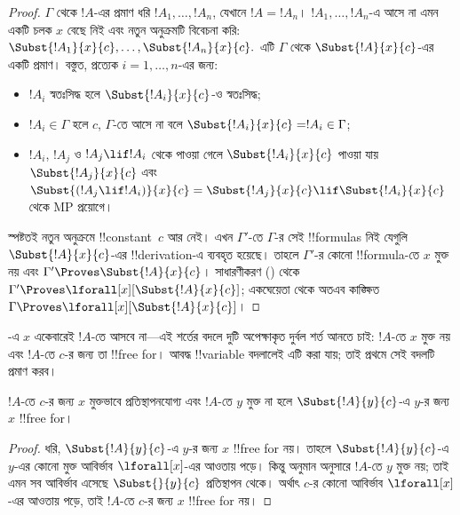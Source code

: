 \documentclass[../../../include/open-logic-section]{subfiles}
\begin{document}
\begin{proof} $\Gamma$ থেকে $!A$-এর প্রমাণ ধরি $!A_1,\ldots,!A_n$,
যেখানে $!A=!A_n$। $!A_1,\ldots,!A_n$-এ আসে না এমন একটি চলক $x$ বেছে নিই
এবং নতুন অনুক্রমটি বিবেচনা করি:
$\Subst{!A_1}{x}{c},\ldots,\Subst{!A_n}{x}{c}.$
এটি $\Gamma$ থেকে $\Subst{!A}{x}{c}$-এর একটি প্রমাণ। বস্তুত,
প্রত্যেক $i=1,\ldots,n$-এর জন্য:
\begin{itemize} \item $!A_i$ স্বতঃসিদ্ধ হলে $\Subst{!A_i}{x}{c}$-ও
স্বতঃসিদ্ধ; \item $!A_i \in \Gamma$ হলে $c$, $\Gamma$-তে আসে না বলে
$\Subst{!A_i}{x}{c} = !A_i \in \Gamma$; \item $!A_i$, $!A_j$
ও $!A_j \lif !A_i$ থেকে পাওয়া গেলে $\Subst{!A_i}{x}{c}$
পাওয়া যায় $\Subst{!A_j}{x}{c}$ এবং $\Subst{(!A_j \lif !A_i)}{x}{c}
= \Subst{!A_j}{x}{c} \lif \Subst{!A_i}{x}{c}$ থেকে MP প্রয়োগে।
\end{itemize} স্পষ্টতই নতুন অনুক্রমে !!{constant}~$c$ আর নেই। এখন
$\Gamma'$-তে $\Gamma$-র সেই !!{formula}s নিই যেগুলি
$\Subst{!A}{x}{c}$-এর !!{derivation}-এ ব্যবহৃত হয়েছে। তাহলে
$\Gamma'$-র কোনো !!{formula}-তে $x$ মুক্ত নয় এবং
$\Gamma' \Proves \Subst{!A}{x}{c}$। সাধারণীকরণ
() থেকে $\Gamma'
\Proves \lforall[x][\Subst{!A}{x}{c}]$; একঘেয়েতা থেকে অতএব কাঙ্ক্ষিত
$\Gamma \Proves \lforall[x][\Subst{!A}{x}{c}]$।
\end{proof}

\begin{explain}
-এ $x$ একেবারেই $!A$-তে আসবে না—এই শর্তের বদলে
দুটি অপেক্ষাকৃত দুর্বল শর্ত আনতে চাই: $!A$-তে $x$ মুক্ত নয় এবং
$!A$-তে $c$-র জন্য তা !!{free for}। আবদ্ধ !!{variable} বদলালেই
এটি করা যায়; তাই প্রথমে সেই বদলটি প্রমাণ করব।
\end{explain}

\begin{lem}
$!A$-তে $c$-র জন্য $x$ মুক্তভাবে প্রতিস্থাপনযোগ্য এবং $!A$-তে $y$ মুক্ত
না হলে $\Subst{!A}{y}{c}$-এ $y$-র জন্য $x$ !!{free for}।
\end{lem}

\begin{proof} ধরি, $\Subst{!A}{y}{c}$-এ $y$-র জন্য $x$
!!{free for} নয়। তাহলে $\Subst{!A}{y}{c}$-এ $y$-এর কোনো মুক্ত
আবির্ভাব $\lforall[x]$-এর আওতায় পড়ে। কিন্তু অনুমান অনুসারে $!A$-তে
$y$ মুক্ত নয়; তাই এমন সব আবির্ভাব এসেছে $\Subst{}{y}{c}$ প্রতিস্থাপন
থেকে। অর্থাৎ $c$-র কোনো আবির্ভাব $\lforall[x]$-এর আওতায় পড়ে,
তাই $!A$-তে $c$-র জন্য $x$ !!{free for} নয়।
\end{proof}
\end{document}
